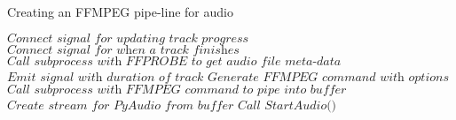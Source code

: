 \documentclass{article}
\begin{document}
\begin{algorithm}
\caption{Creating an FFMPEG pipe-line for audio}
\begin{algorithmic}[1]
\State $\textit{Connect signal for updating track progress}$
\State $\textit{Connect signal for when a track finishes}$
\State $\textit{Call subprocess with FFPROBE to get audio file meta-data}$
\State $\textit{Emit signal with duration of track}$
\State $\textit{Generate FFMPEG command with options}$
\State $\textit{Call subprocess with FFMPEG command to pipe into buffer}$
\State $\textit{Create stream for PyAudio from buffer}$
\State $\textit{Call StartAudio()}$
\EndProcedure
\end{algorithmic}
\end{algorithm}
\end{document}
